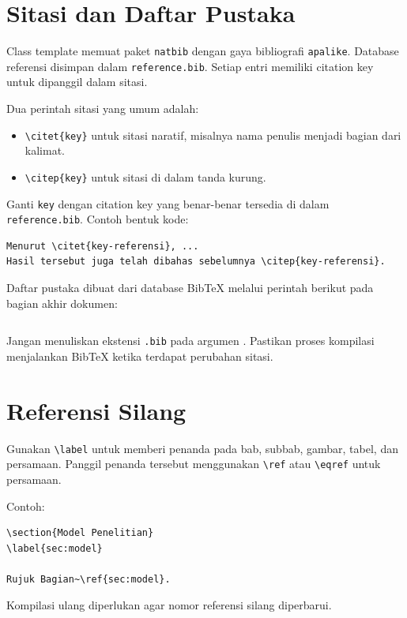 \documentclass[skripsi]{ugmskripsi}
\begin{document}
\section{Sitasi dan Daftar Pustaka}
Class template memuat paket \texttt{natbib} dengan gaya bibliografi
\texttt{apalike}. Database referensi disimpan dalam \texttt{reference.bib}.
Setiap entri memiliki citation key untuk dipanggil dalam sitasi.

Dua perintah sitasi yang umum adalah:
\begin{itemize}
    \item \verb|\citet{key}| untuk sitasi naratif, misalnya nama penulis menjadi
    bagian dari kalimat.
    \item \verb|\citep{key}| untuk sitasi di dalam tanda kurung.
\end{itemize}

Ganti \texttt{key} dengan citation key yang benar-benar tersedia di dalam
\texttt{reference.bib}. Contoh bentuk kode:
\begin{verbatim}
Menurut \citet{key-referensi}, ...
Hasil tersebut juga telah dibahas sebelumnya \citep{key-referensi}.
\end{verbatim}

Daftar pustaka dibuat dari database BibTeX melalui perintah berikut pada
bagian akhir dokumen:
\begin{verbatim}

\end{verbatim}

Jangan menuliskan ekstensi \texttt{.bib} pada argumen \verb||.
Pastikan proses kompilasi menjalankan BibTeX ketika terdapat perubahan sitasi.

\section{Referensi Silang}
Gunakan \verb|\label| untuk memberi penanda pada bab, subbab, gambar, tabel,
dan persamaan. Panggil penanda tersebut menggunakan \verb|\ref| atau
\verb|\eqref| untuk persamaan.

Contoh:
\begin{verbatim}
\section{Model Penelitian}
\label{sec:model}

Rujuk Bagian~\ref{sec:model}.
\end{verbatim}

Kompilasi ulang diperlukan agar nomor referensi silang diperbarui.
\end{document}
